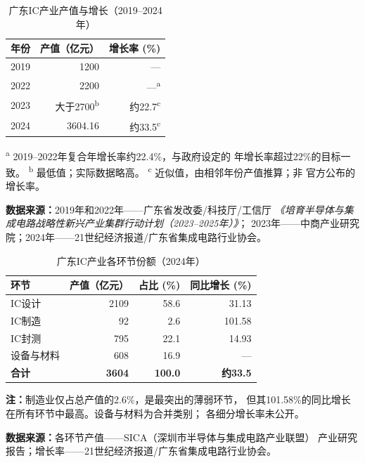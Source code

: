 \documentclass[12pt,a4paper]{article}
\newcommand{\tableHeaderRow}{\rowcolor{tealPrimary}\color{white}}
\newcommand{\tableOddRow}{\rowcolor{mintBG}}
\newcommand{\tableEvenRow}{\rowcolor{white}}
\begin{document}
\begin{table}[H]
\centering
\caption{广东IC产业产值与增长（2019--2024年）}
\label{tab:core}
\begin{tabular}{lrr}
\toprule
\tableHeaderRow
\textbf{年份} & \textbf{产值（亿元）} & \textbf{增长率 (\%)} \\
\midrule
\tableOddRow  2019 & 1200 & --- \\
\tableEvenRow 2022 & 2200 & ---\textsuperscript{a} \\
\tableOddRow  2023 & 大于2700\textsuperscript{b} & 约22.7\textsuperscript{c} \\
\tableEvenRow 2024 & 3604.16 & 约33.5\textsuperscript{c} \\
\bottomrule
\end{tabular}

\vspace{2pt}
{\footnotesize
\textsuperscript{a} 2019--2022年复合年增长率约22.4\%，与政府设定的
年增长率超过22\%的目标一致。
\textsuperscript{b} 最低值；实际数据略高。
\textsuperscript{c} 近似值，由相邻年份产值推算；非
官方公布的增长率。

\textbf{数据来源：}2019年和2022年——广东省发改委/科技厅/工信厅
\textit{《培育半导体与集成电路战略性新兴产业集群行动计划（2023--2025年）》}；
2023年——中商产业研究院；2024年——21世纪经济报道/广东省集成电路行业协会。}
\end{table}

\begin{table}[H]
\centering
\caption{广东IC产业各环节份额（2024年）}
\label{tab:subsector2024}
\begin{tabular}{lrrr}
\toprule
\tableHeaderRow
\textbf{环节} & \textbf{产值（亿元）} & \textbf{占比 (\%)} & \textbf{同比增长 (\%)} \\
\midrule
\tableOddRow  IC设计    & 2109 & 58.6 & 31.13 \\
\tableEvenRow IC制造    & 92 & 2.6 & 101.58 \\
\tableOddRow  IC封测    & 795 & 22.1 & 14.93 \\
\tableEvenRow 设备与材料 & 608 & 16.9 & --- \\
\midrule
\tableOddRow  \textbf{合计} & \textbf{3604} & \textbf{100.0} & \textbf{约33.5} \\
\bottomrule
\end{tabular}

\vspace{2pt}
{\footnotesize
\textbf{注：}制造业仅占总产值的2.6\%，是最突出的薄弱环节，
但其101.58\%的同比增长在所有环节中最高。设备与材料为合并类别；
各细分增长率未公开。

\textbf{数据来源：}各环节产值——SICA（深圳市半导体与集成电路产业联盟）
产业研究报告；增长率——21世纪经济报道/广东省集成电路行业协会。}
\end{table}
\end{document}
